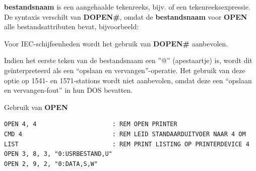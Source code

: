 \begin{description}[leftmargin=2cm,style=nextline]
{\bf bestandsnaam} is een aangehaalde tekenreeks, bijv.  of een tekenreeksexpressie. De syntaxis verschilt van {\bf DOPEN\#}, omdat de {\bf bestandsnaam} voor {\bf OPEN} alle bestandsattributen bevat, bijvoorbeeld: 

\item [Opmerkingen:]  Voor IEC-schijfeenheden wordt het gebruik van {\bf DOPEN\#} aanbevolen.

                  Indien het eerste teken van de bestandsnaam een ''@'' (apestaartje) is, wordt dit geïnterpreteerd als een ``opslaan en vervangen''-operatie. Het gebruik van deze optie op 1541- en 1571-stations wordt niet aanbevolen, omdat deze een ``opslaan en vervangen-fout'' in hun DOS bevatten.

\item [Voorbeeld:]  Gebruik van {\bf OPEN}

\begin{tcolorbox}[colback=black,coltext=white]
\verbatimfont{\codefont}
\begin{verbatim}
OPEN 4, 4                     : REM OPEN PRINTER
CMD 4                         : REM LEID STANDAARDUITVOER NAAR 4 OM
LIST                          : REM PRINT LISTING OP PRINTERDEVICE 4
OPEN 3, 8, 3, "0:USRBESTAND,U"
OPEN 2, 9, 2, "0:DATA,S,W"
\end{verbatim}
\end{tcolorbox}
\end{description}


\newpage
